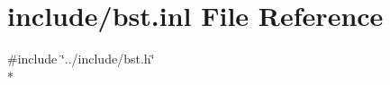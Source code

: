 \hypertarget{bst_8inl}{}\section{include/bst.inl File Reference}
\label{bst_8inl}
{\ttfamily \#include \char`\"{}../include/bst.\+h\char`\"{}}\\*
